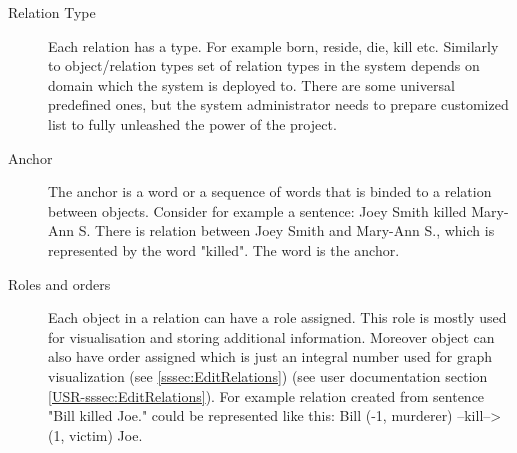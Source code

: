 \begin{description}
\item[Relation Type]
Each relation has a type. For example born, reside, die, kill etc. Similarly to
object/relation types set of relation types in the system depends on domain
which the system is deployed to. There are some universal predefined ones, but
the system administrator needs to prepare customized list to fully unleashed the
power of the project.

\item[Anchor]
The anchor is a word or a sequence of words that is binded to a relation between
objects. Consider for example a sentence: Joey Smith killed Mary-Ann S. There is
relation between Joey Smith and Mary-Ann S., which is represented by the word
"killed". The word is the anchor.

\item[Roles and orders]
Each object in a relation can have a role assigned. This role is mostly used
for visualisation and storing additional information. Moreover object can also
have order assigned which is just an integral number used for graph
visualization\ifdefined\USRDOC{} (see \ref{sssec:EditRelations})\fi{}
\ifdefined\DEVDOC{} (see user documentation section
\ref{USR-sssec:EditRelations})\fi{}. For example relation created from sentence
"Bill killed Joe." could be represented like this:
Bill (-1, murderer) --kill--> (1, victim) Joe.
\end{description}

